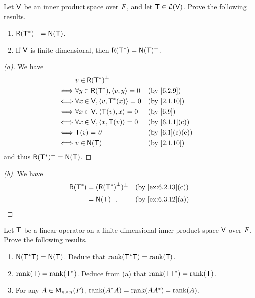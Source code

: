 \begin{ex}\label{ex:6.3.12}
  Let \(\mathsf{V}\) be an inner product space over \(\mathit{F}\), and let \(\mathsf{T} \in \mathcal{L}(\mathsf{V})\).
  Prove the following results.
  \begin{enumerate}
    \item \(\rg{\T^*}^{\perp} = \ns{\T}\).
    \item If \(\mathsf{V}\) is finite-dimensional, then \(\rg{\T^*} = \ns{\T}^{\perp}\).
  \end{enumerate}
\end{ex}

\begin{proof}[(a)]
  We have
  \begin{align*}
         & v \in \rg{\T^*}^{\perp}                                    \\
    \iff & \forall y \in \rg{\T^*}, \inn{v, y} = 0 &  & \by{6.2.9}    \\
    \iff & \forall x \in \V, \inn{v, \T^*(x)} = 0  &  & \by{2.1.10}   \\
    \iff & \forall x \in \V, \inn{\T(v), x} = 0    &  & \by{6.9}      \\
    \iff & \forall x \in \V, \inn{x, \T(v)} = 0    &  & \by{6.1.1}[c] \\
    \iff & \T(v) = \zv                             &  & \by{6.1}[c,e] \\
    \iff & v \in \ns{\T}                           &  & \by{2.1.10}
  \end{align*}
  and thus \(\rg{\T^*}^{\perp} = \ns{\T}\).
\end{proof}

\begin{proof}[(b)]
  We have
  \begin{align*}
    \rg{\T^*} & = (\rg{\T^*}^{\perp})^{\perp} &  & \by{ex:6.2.13}[c] \\
              & = \ns{\T}^{\perp}.            &  & \by{ex:6.3.12}[a]
  \end{align*}
\end{proof}

\begin{ex}\label{ex:6.3.13}
  Let \(\mathsf{T}\) be a linear operator on a finite-dimensional inner product space \(\mathsf{V}\) over \(\mathit{F}\).
  Prove the following results.
  \begin{enumerate}
    \item \(\ns{\T^* \T} = \ns{\T}\).
          Deduce that \(\rk{\T^* \T} = \rk{\T}\).
    \item \(\rk{\T} = \rk{\T^*}\).
          Deduce from (a) that \(\rk{\T \T^*} = \rk{\T}\).
    \item For any \(A \in \ms[n][n][\F]\), \(\rk{A^* A} = \rk{A A^*} = \rk{A}\).
  \end{enumerate}
\end{ex}


